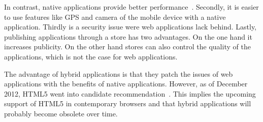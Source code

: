 \documentclass[a4paper]{artikel3}
\begin{document}
In contrast, native applications provide better performance~\cite{Accenture2012}.
Secondly, it is easier to use features like GPS and camera of the mobile device with a native application.
Thirdly is a security issue were web applications lack behind.
Lastly, publishing applications through a store has two advantages.
On the one hand it increases publicity.
On the other hand stores can also control the quality of the applications, which is not the case for web applications.

The advantage of hybrid applications is that they patch the issues of web applications with the benefits of native applications.
However, as of December 2012, HTML5 went into candidate recommendation~\cite{Jacobs2012}.
This implies the upcoming support of HTML5 in contemporary browsers and that hybrid applications will probably become obsolete over time.

%
%
\end{document}
